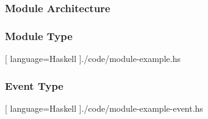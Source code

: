 \begin{frame}
  \frametitle{Module Architecture}
  \begin{figure}
    \centering
    
  \end{figure}
\end{frame}

\begin{frame}
  \frametitle{Module Type}
  \begin{center}
    
    [ language=Haskell
    ]{./code/module-example.hs}
  \end{center}
\end{frame}


\begin{frame}
  \frametitle{Event Type}
  \begin{center}
    
    [ language=Haskell
    ]{./code/module-example-event.hs}
  \end{center}
\end{frame}
